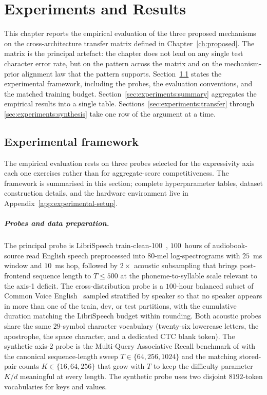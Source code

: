 \chapter{Experiments and Results}\label{ch:experiments}

This chapter reports the empirical evaluation of the three
proposed mechanisms on the cross-architecture transfer matrix
defined in Chapter~\ref{ch:proposed}. The matrix is the principal
artefact: the chapter does not lead on any single test character
error rate, but on the pattern across the matrix and on the
mechanism-prior alignment law that the pattern supports.
Section~\ref{sec:experiments:framework} states the experimental
framework, including the probes, the evaluation conventions, and
the matched training budget. Section~\ref{sec:experiments:summary}
aggregates the empirical results into a single table.
Sections~\ref{sec:experiments:transfer} through
\ref{sec:experiments:synthesis} take one row of the argument at a
time.

\section{Experimental framework}\label{sec:experiments:framework}

The empirical evaluation rests on three probes selected for the
expressivity axis each one exercises rather than for
aggregate-score competitiveness. The framework is summarised in
this section; complete hyperparameter tables, dataset construction
details, and the hardware environment live in
Appendix~\ref{app:experimental-setup}.

\paragraph{Probes and data preparation.} The principal probe is
LibriSpeech train-clean-100~\cite{panayotov2015librispeech},
$100$~hours of audiobook-source read English speech preprocessed
into $80$-mel log-spectrograms with $25$~ms window and $10$~ms
hop, followed by $2\times$ acoustic subsampling that brings
post-frontend sequence length to $T \le 500$ at the
phoneme-to-syllable scale relevant to the axis-1 deficit. The
cross-distribution probe is a $100$-hour balanced subset of
Common Voice English~\cite{ardila2019commonvoice} sampled
stratified by speaker so that no speaker appears in more than one
of the train, dev, or test partitions, with the cumulative
duration matching the LibriSpeech budget within rounding. Both
acoustic probes share the same $29$-symbol character vocabulary
(twenty-six lowercase letters, the apostrophe, the space
character, and a dedicated CTC blank token). The synthetic axis-2
probe is the Multi-Query Associative Recall benchmark of
\citet{arora2023zoology} with the canonical sequence-length sweep
$T \in \{64, 256, 1024\}$ and the matching stored-pair counts
$K \in \{16, 64, 256\}$ that grow with $T$ to keep the difficulty
parameter $K / d$ meaningful at every length. The synthetic probe
uses two disjoint $8192$-token vocabularies for keys and values.

